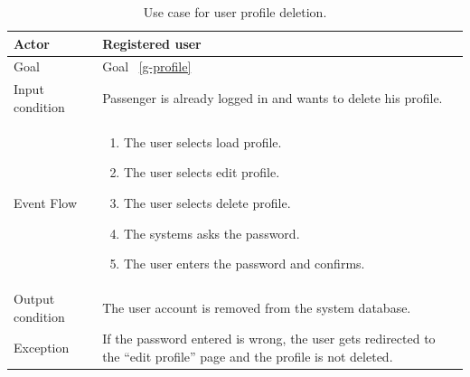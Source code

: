 \begin{table}
\begin{center}
\begin{tabular}{| l | p{} |}
\hline
Actor & Registered user \\
\hline
Goal & Goal ~\ref{g-profile}
\\
\hline
Input condition & Passenger is already logged in and wants to delete his profile.  \\
\hline
Event Flow & \begin{enumerate}
	\item The user selects load profile.
	\item The user selects edit profile.
	\item The user selects delete profile.
	\item The systems asks the password.
	\item The user enters the password and confirms.
	\end{enumerate}
\\
\hline
Output condition & The user account is removed from the system database. \\
\hline

Exception & If the password entered is wrong, the user gets redirected to the ``edit profile'' page and the profile is not deleted. \\
\hline
\end{tabular}
\end{center}
\caption{Use case for user profile deletion.}
\label{usecase-profile-delete}
\end{table}

